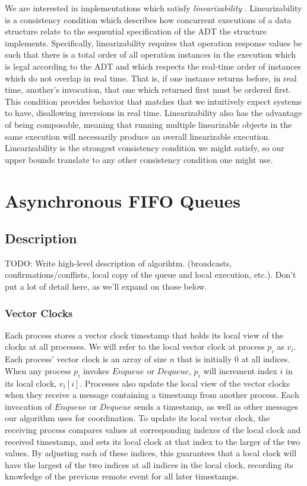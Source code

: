 \documentclass[a4paper,USenglish]{lipics-v2021} %
\begin{document}
We are interested in implementations which satisfy \emph{linearizability} \cite{HerlihyWing90}.  Linearizability is a consistency condition which describes how concurrent executions of a data structure relate to the sequential specification of the ADT the structure implements.  Specifically, linearizability requires that operation response values be such that there is a total order of all operation instances in the execution which is legal according to the ADT and which respects the real-time order of instances which do not overlap in real time.  That is, if one instance returns before, in real time, another's invocation, that one which returned first must be ordered first.  This condition provides behavior that matches that we intuitively expect systems to have, disallowing inversions in real time.  Linearizability also has the advantage of being composable, meaning that running multiple linearizable objects in the same execution will necessarily produce an overall linearizable execution.  Linearizability is the strongest consistency condition we might satisfy, so our upper bounds translate to any other consistency condition one might use.  

\section{Asynchronous FIFO Queues}

\subsection{Description}

TODO: Write high-level description of algorihtm. (broadcasts, confirmations/conflists, local copy of the queue and local execution, etc.).  Don't put a lot of detail here, as we'll expand on those below.

\subsubsection{Vector Clocks}

Each process stores a vector clock timestamp that holds its local view of the clocks at all processes.  We will refer to the local vector clock at process $p_i$ as $v_i$.  Each process' vector clock is an array of size $n$ that is initially 0 at all indices.  When any process $p_i$ invokes $Enqueue$ or $Dequeue$, $p_i$ will increment index $i$ in its local clock, $v_i[i]$.  Processes also update the local view of the vector clocks when they receive a message containing a timestamp from another process.  Each invocation of $Enqueue$ or $Dequeue$ sends a timestamp, as well as other messages our algorithm uses for coordination.  To update its local vector clock, the receiving process compares values at corresponding indexes of the local clock and received timestamp, and sets its local clock at that index to the larger of the two values.  By adjusting each of these indices, this guarantees that a local clock will have the largest of the two indices at all indices in the local clock, recording its knowledge of the previous remote event for all later timestamps.
\end{document}
